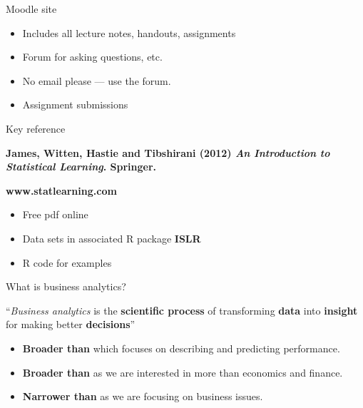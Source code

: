 \documentclass[14pt]{beamer}
\begin{document}
\begin{frame}{Moodle site}

\begin{itemize}
\item Includes all lecture notes, handouts, assignments
\item Forum for asking questions, etc.
\item No email please --- use the forum.
\item Assignment submissions
\end{itemize}

\end{frame}

\begin{frame}{Key reference}\large

\begin{block}{}\bf
{James, Witten, Hastie and Tibshirani (2012) \emph{An Introduction to Statistical Learning}. Springer.}
\end{block}
\begin{alertblock}{}\Large
\centerline{\bf www.statlearning.com}
\end{alertblock}

\begin{itemize}
\item Free pdf online
\item Data sets in associated R package \textbf{ISLR}
\item R code for examples
\end{itemize}
\end{frame}


\begin{frame}{What is business analytics?}


\begin{block}{}
``\emph{Business analytics} is the \textbf{scientific process} of transforming \textbf{data} into \textbf{insight} for making better \textbf{decisions}''
\end{block}\pause
\begin{itemize}
\item \textbf{Broader than } which focuses on describing and predicting performance.
\item \textbf{Broader than } as we are interested in more than economics and  finance.
\item \textbf{Narrower than } as we are focusing on {business issues}.
\end{itemize}

\end{frame}
\end{document}
